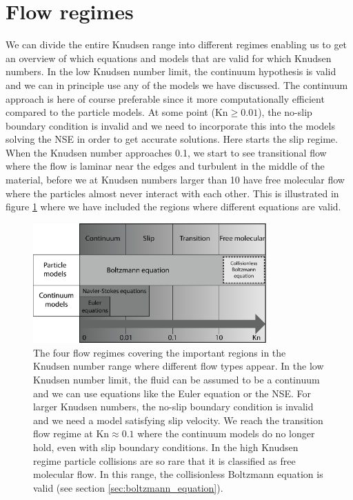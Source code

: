 \section{Flow regimes}
We can divide the entire Knudsen range into different regimes enabling us to get an overview of which equations and models that are valid for which Knudsen numbers. In the low Knudsen number limit, the continuum hypothesis is valid and we can in principle use any of the models we have discussed. The continuum approach is here of course preferable since it more computationally efficient compared to the particle models. At some point (Kn$\geq 0.01$), the no-slip boundary condition is invalid and we need to incorporate this into the models solving the NSE in order to get accurate solutions. Here starts the slip regime. When the Knudsen number approaches 0.1, we start to see transitional flow where the flow is laminar near the edges and turbulent in the middle of the material, before we at Knudsen numbers larger than 10 have free molecular flow where the particles almost never interact with each other. This is illustrated in figure \ref{fig:flow_regimes} where we have included the regions where different equations are valid.
\begin{figure}[h!]
\begin{center}
\includegraphics[width=0.8\textwidth, trim=0cm 0cm 0cm 0cm, clip]{figures/flowregimes.eps}
\end{center}
\caption{The four flow regimes covering the important regions in the Knudsen number range where different flow types appear. In the low Knudsen number limit, the fluid can be assumed to be a continuum and we can use equations like the Euler equation or the NSE. For larger Knudsen numbers, the no-slip boundary condition is invalid and we need a model satisfying slip velocity. We reach the transition flow regime at Kn$\approx 0.1$ where the continuum models do no longer hold, even with slip boundary conditions. In the high Knudsen regime particle collisions are so rare that it is classified as free molecular flow. In this range, the collisionless Boltzmann equation is valid (see section \ref{sec:boltzmann_equation}).}
\label{fig:flow_regimes}
\end{figure}